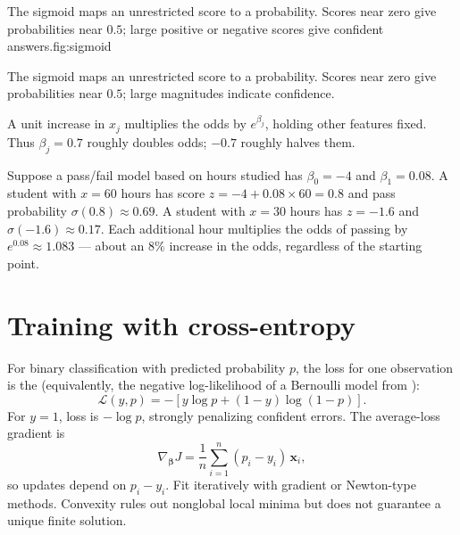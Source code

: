 \begin{utpfig}{The sigmoid maps an unrestricted score to a probability. Scores near zero give probabilities near $0.5$; large positive or negative scores give confident answers.}{fig:sigmoid}
\end{utpfig}

\begin{intuition}
The sigmoid maps an unrestricted score to a probability. Scores near zero give probabilities near $0.5$; large magnitudes indicate confidence.
\end{intuition}

A unit increase in $x_j$ multiplies the odds by $e^{\beta_j}$, holding other features fixed. Thus $\beta_j=0.7$ roughly doubles odds; $-0.7$ roughly halves them.

\begin{workedexample}
Suppose a pass/fail model based on hours studied has $\beta_0=-4$ and $\beta_1=0.08$.
A student with $x=60$ hours has score $z=-4+0.08\times 60=0.8$ and pass probability $\sigma(0.8)\approx 0.69$.
A student with $x=30$ hours has $z=-1.6$ and $\sigma(-1.6)\approx 0.17$.
Each additional hour multiplies the odds of passing by $e^{0.08}\approx 1.083$ --- about an $8\%$ increase in the odds, regardless of the starting point.
\end{workedexample}

\section{Training with cross-entropy}

For binary classification with predicted probability $p$, the loss for one observation is the  (equivalently, the negative log-likelihood of a Bernoulli model from ):
\[
  \mathcal{L}(y,p)
  =-[y\log p+(1-y)\log(1-p)].
\]
For $y=1$, loss is $-\log p$, strongly penalizing confident errors. The average-loss gradient is
\[
  \nabla_{\bm{\beta}}J
  =\frac{1}{n}\sum_{i=1}^{n}(p_i-y_i)\,\bm{x}_i,
\]
so updates depend on $p_i-y_i$. Fit iteratively with gradient or Newton-type methods. Convexity rules out nonglobal local minima but does not guarantee a unique finite solution.

